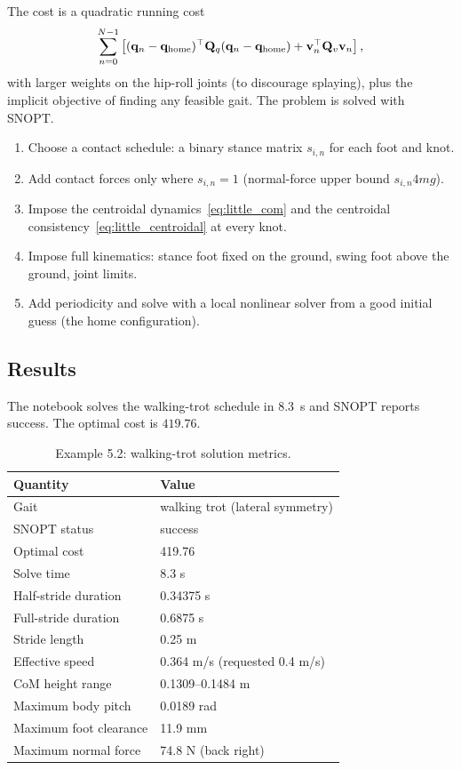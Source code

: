 \documentclass[11pt]{article}
\newcommand{\bq}{\mathbf{q}}
\newcommand{\bv}{\mathbf{v}}
\newcommand{\bQ}{\mathbf{Q}}
\begin{document}
The cost is a quadratic running cost
\begin{equation}
\sum_{n=0}^{N-1}\left[
(\bq_n-\bq_{\rm home})^\top \bQ_q(\bq_n-\bq_{\rm home})
+\bv_n^\top \bQ_v\bv_n
\right],
\end{equation}
with larger weights on the hip-roll joints (to discourage splaying), plus the
implicit objective of finding any feasible gait.  The problem is solved with
SNOPT.

\begin{recipe}[breakable=false,title={Contact-implicit versus contact-scheduled transcription}]
\begin{enumerate}[leftmargin=1.4em,itemsep=2pt]
  \item Choose a contact schedule: a binary stance matrix $s_{i,n}$ for each
        foot and knot.
  \item Add contact forces only where $s_{i,n}=1$ (normal-force upper bound
        $s_{i,n}4mg$).
  \item Impose the centroidal dynamics~\eqref{eq:little_com} and the
        centroidal consistency~\eqref{eq:little_centroidal} at every knot.
  \item Impose full kinematics: stance foot fixed on the ground, swing foot
        above the ground, joint limits.
  \item Add periodicity and solve with a local nonlinear solver from a good
        initial guess (the home configuration).
\end{enumerate}
\end{recipe}

\subsection{Results}

The notebook solves the walking-trot schedule in 8.3~s and SNOPT reports
success.  The optimal cost is $419.76$.

\begin{table}[H]
\centering
\caption{Example 5.2: walking-trot solution metrics.}
\begin{tabular}{ll}
\toprule
Quantity & Value \\
\midrule
Gait & walking trot (lateral symmetry) \\
SNOPT status & success \\
Optimal cost & 419.76 \\
Solve time & 8.3 s \\
Half-stride duration & 0.34375 s \\
Full-stride duration & 0.6875 s \\
Stride length & 0.25 m \\
Effective speed & 0.364 m/s (requested 0.4 m/s) \\
CoM height range & 0.1309--0.1484 m \\
Maximum body pitch & 0.0189 rad \\
Maximum foot clearance & 11.9 mm \\
Maximum normal force & 74.8 N (back right) \\
\bottomrule
\end{tabular}
\end{table}
\end{document}
